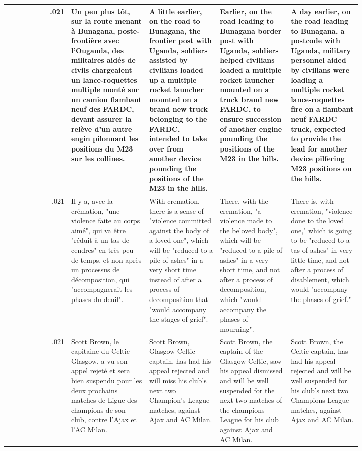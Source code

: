 \begin{table}[ht]
\begin{tabular}{r @{\hspace{2mm}} p{0.22\linewidth}p{0.20\linewidth}p{0.20\linewidth}p{0.20\linewidth}}
.021 & Un peu plus tôt, sur la route menant à Bunagana, poste-frontière avec l'Ouganda, des militaires aidés de civils chargeaient un lance-roquettes multiple monté sur un camion flambant neuf des FARDC, devant assurer la relève d'un autre engin pilonnant les positions du M23 sur les collines. & A little earlier, on the road to Bunagana, the frontier post with Uganda, soldiers assisted by civilians loaded up a multiple rocket launcher mounted on a brand new truck belonging to the FARDC, intended to take over from another device pounding the positions of the M23 in the hills. & Earlier, on the road leading to Bunagana border post with Uganda, soldiers helped civilians loaded a multiple rocket launcher mounted on a truck brand new FARDC, to ensure succession of another engine pounding the positions of the M23 in the hills. & A day earlier, on the road leading to Bunagana, a postcode with Uganda, military personnel aided by civilians were loading a multiple rocket lance-roquettes fire on a flambant neuf FARDC truck, expected to provide the lead for another device pilfering M23 positions on the hills. \\\hline
.021 & Il y a, avec la crémation, "une violence faite au corps aimé", qui va être "réduit à un tas de cendres" en très peu de temps, et non après un processus de décomposition, qui "accompagnerait les phases du deuil". & With cremation, there is a sense of "violence committed against the body of a loved one", which will be "reduced to a pile of ashes" in a very short time instead of after a process of decomposition that "would accompany the stages of grief". & There, with the cremation, "a violence made to the beloved body", which will be "reduced to a pile of ashes" in a very short time, and not after a process of decomposition, which "would accompany the phases of mourning". & There is, with cremation, "violence done to the loved one," which is going to be "reduced to a tas of ashes" in very little time, and not after a process of disablement, which would "accompany the phases of grief." \\\hline
.021 & Scott Brown, le capitaine du Celtic Glasgow, a vu son appel rejeté et sera bien suspendu pour les deux prochains matches de Ligue des champions de son club, contre l'Ajax et l'AC Milan. & Scott Brown, Glasgow Celtic captain, has had his appeal rejected and will miss his club's next two Champion's League matches, against Ajax and AC Milan. & Scott Brown, the captain of the Glasgow Celtic, saw his appeal dismissed and will be well suspended for the next two matches of the champions League for his club against Ajax and AC Milan. & Scott Brown, the Celtic captain, has had his appeal rejected and will be well suspended for his club's next two Champions League matches, against Ajax and AC Milan. \\\hline

\end{tabular}
\end{table}
